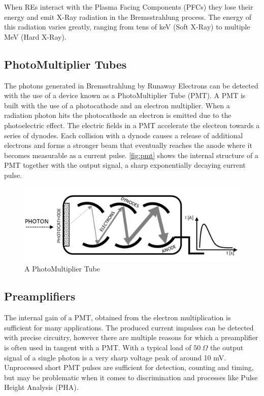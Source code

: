 When REs interact with the Plasma Facing Components (PFCs)
they lose their energy and emit X-Ray radiation in 
the Bremsstrahlung process. The energy of this radiation
varies greatly, ranging from tens of keV (Soft X-Ray)
to multiple MeV (Hard X-Ray).
\cite{hxrm_jet}

\subsection{PhotoMultiplier Tubes}

The photons generated in Bremsstrahlung by Runaway Electrons
can be detected with the use of a device known as a PhotoMultiplier Tube (PMT).
A PMT is built with the use of a photocathode and an electron multiplier.
When a radiation photon hits the photocathode an electron is emitted
due to the photoelectric effect. The electric fields in a PMT accelerate the 
electron towards a series of dynodes. Each collision with a dynode causes
a release of additional electrons and forms a stronger beam that 
eventually reaches the anode where it becomes measurable as a current pulse.
\autoref{fig:pmt} shows the internal structure of a PMT together with the output
signal, a sharp exponentially decaying current pulse.
\cite{pmts_basics, pmt_gain}
\begin{figure}[H]
  \centering
  \includegraphics[width=.7\linewidth]{media/pmt.png}
  \caption{A PhotoMultiplier Tube}
  \label{fig:pmt}
\end{figure}
\subsection{Preamplifiers}

The internal gain of a PMT, obtained from the electron multiplication
is sufficient for many applications. The produced current impulses 
can be detected with precise circuitry,
however there are multiple reasons for which
a preamplifier is often used in tangent with a PMT. With a typical
load of $50 \: \Omega$ the output signal of a single photon is
a very sharp voltage peak of around 10 mV.
Unprocessed short PMT pulses are sufficient for detection, counting 
and timing, but may be problematic when it comes to discrimination and 
processes like Pulse Height Analysis (PHA).
\cite{why_pmt_need_amplifiers}


